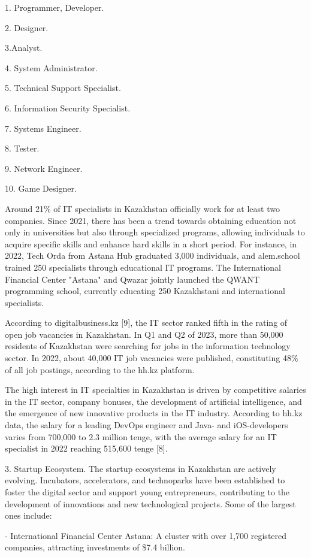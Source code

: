 1. Programmer, Developer.

2. Designer.

3.Analyst.

4. System Administrator.

5. Technical Support Specialist.

6. Information Security Specialist.

7. Systems Engineer.

8. Tester.

9. Network Engineer.

10. Game Designer.

Around 21\% of IT specialists in Kazakhstan officially work for at least
two companies. Since 2021, there has been a trend towards obtaining
education not only in universities but also through specialized
programs, allowing individuals to acquire specific skills and enhance
hard skills in a short period. For instance, in 2022, Tech Orda from
Astana Hub graduated 3,000 individuals, and alem.school trained 250
specialists through educational IT programs. The International Financial
Center "Astana" and Qwazar jointly launched the QWANT programming
school, currently educating 250 Kazakhstani and international
specialists.

According to digitalbusiness.kz {[}9{]}, the IT sector ranked fifth in
the rating of open job vacancies in Kazakhstan. In Q1 and Q2 of 2023,
more than 50,000 residents of Kazakhstan were searching for jobs in the
information technology sector. In 2022, about 40,000 IT job vacancies
were published, constituting 48\% of all job postings, according to the
hh.kz platform.

The high interest in IT specialties in Kazakhstan is driven by
competitive salaries in the IT sector, company bonuses, the development
of artificial intelligence, and the emergence of new innovative products
in the IT industry. According to hh.kz data, the salary for a leading
DevOps engineer and Java- and iOS-developers varies from 700,000 to 2.3
million tenge, with the average salary for an IT specialist in 2022
reaching 515,600 tenge {[}8{]}.

3. Startup Ecosystem. The startup ecosystems in Kazakhstan are actively
evolving. Incubators, accelerators, and technoparks have been
established to foster the digital sector and support young
entrepreneurs, contributing to the development of innovations and new
technological projects. Some of the largest ones include:

- International Financial Center Astana: A cluster with over 1,700
registered companies, attracting investments of \$7.4 billion.

